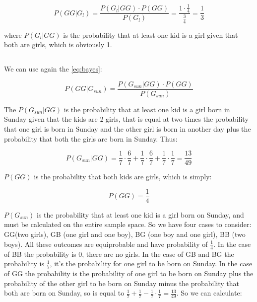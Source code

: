 \documentclass{article}
\begin{document}
\begin{equation} \label{eq:bayes2}
P(GG | G_{l}) = \frac {P(G_{l} | GG) \cdot P(GG)} {P(G_{l})} = \frac {1 \cdot \frac{1}{4}} {\frac{3}{4}} = \frac {1} {3}
\end{equation}

where $P(G_{l} | GG)$ is the probability that at least one kid is a girl given that both are girls, which is obviously 1.



\subsection{}
We can use again the \eqref{eq:bayes}:

\begin{equation} \label{eq:bayes3}
P(GG | G_{sun}) = \frac {P(G_{sun} | GG) \cdot P(GG)} {P(G_{sun})} 
\end{equation}


The $P(G_{sun} | GG)$ is the probability that at least one kid is a girl born in Sunday given that the kids are 2 girls, that is equal at two times the probability that one girl is born in Sunday and the other girl is born in another day plus the probability that both the girls are born in Sunday. Thus:

\begin{equation} \label{eq:probGsunGG}
P(G_{sun} | GG) = \frac {1} {7} \cdot \frac {6} {7} + \frac {1} {7} \cdot \frac {6} {7} + \frac {1} {7} \cdot \frac {1} {7} = \frac {13} {49}
\end{equation}

$P(GG)$ is the probability that both kids are girls, which is simply:

\begin{equation} \label{eq:probGG}
P(GG) = \frac {1} {4} 
\end{equation}


$P(G_{sun})$ is the probability that at least one kid is a girl born on Sunday, and must be calculated on the entire sample space. So we have four cases to consider: GG(two girls), GB (one girl and one boy), BG (one boy and one girl), BB (two boys). All these outcomes are equiprobable and have probability of $\frac {1} {4}$. In the case of BB the probability is $0$, there are no girls. In the case of GB and BG the probability is $\frac {1} {7}$, it's the probability for one girl to be born on Sunday. In the case of GG the probability is the probability of one girl to be born on Sunday plus the probability of the other girl to be born on Sunday minus the probability that both are born on Sunday, so is equal to $\frac {1} {7} + \frac {1} {7} - \frac {1} {7} \cdot \frac {1} {7} = \frac {13} {49}$. So we can calculate:
\end{document}

